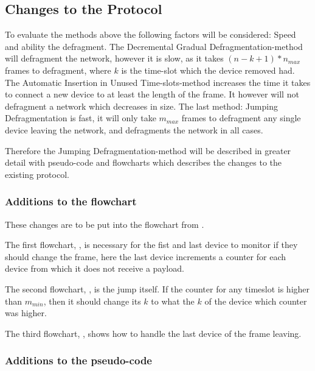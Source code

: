 \subsection{Changes to the Protocol}
To evaluate the methods above the following factors will be considered: Speed and ability the defragment.
The Decremental Gradual Defragmentation-method will defragment the network, however it is slow, as it takes $(n - k + 1) * n_{max}$ frames to defragment, where $k$ is the time-slot which the device removed had. 
The Automatic Insertion in Unused Time-slots-method increases the time it takes to connect a new device to at least the length of the frame. 
It however will not defragment a network which decreases in size. 
The last method: Jumping Defragmentation is fast, it will only take $m_{max}$ frames to defragment any single device leaving the network, and defragments the network in all cases. 

Therefore the Jumping Defragmentation-method will be described in greater detail with pseudo-code and flowcharts which describes the changes to the existing protocol. 

\subsubsection{Additions to the flowchart}
These changes are to be put into the flowchart from .

The first flowchart, , is necessary for the fist and last device to monitor if they should change the frame, here the last device increments a counter for each device from which it does not receive a payload.


The second flowchart, , is the jump itself.
If the counter for any timeslot is higher than $m_{min}$, then it should change its $k$ to what the $k$ of the device which counter was higher.

The third flowchart, , shows how to handle the last device of the frame leaving.


\subsubsection{Additions to the pseudo-code}

